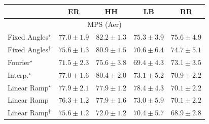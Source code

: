 \begin{tabular}{l|cccc|}
\toprule
            & ER & HH & LB & RR \\
\midrule
\multicolumn{5}{c}{\rule{0pt}{8pt}MPS (Aer)} \\
\midrule
Fixed Angles$^\star$ & {\cellcolor[HTML]{8A55A7}} \color[HTML]{F1F1F1} $77.0\pm 1.9$ & {\cellcolor[HTML]{831F86}} \color[HTML]{F1F1F1} $82.2\pm 1.3$ & {\cellcolor[HTML]{8C66AF}} \color[HTML]{F1F1F1} $75.3\pm 3.9$ & {\cellcolor[HTML]{8B62AD}} \color[HTML]{F1F1F1} $75.6\pm 4.9$ \\
Fixed Angles$^\dagger$ & {\cellcolor[HTML]{8B62AD}} \color[HTML]{F1F1F1} $75.6\pm 1.3$ & {\cellcolor[HTML]{852D90}} \color[HTML]{F1F1F1} $80.9\pm 1.5$ & {\cellcolor[HTML]{8C93C4}} \color[HTML]{F1F1F1} $70.6\pm 6.4$ & {\cellcolor[HTML]{8C6CB1}} \color[HTML]{F1F1F1} $74.7\pm 5.1$ \\
Fourier$^\star$ & {\cellcolor[HTML]{8C8BC0}} \color[HTML]{F1F1F1} $71.5\pm 2.3$ & {\cellcolor[HTML]{8B62AD}} \color[HTML]{F1F1F1} $75.6\pm 3.8$ & {\cellcolor[HTML]{909ECA}} \color[HTML]{F1F1F1} $69.4\pm 4.3$ & {\cellcolor[HTML]{8C7AB8}} \color[HTML]{F1F1F1} $73.1\pm 3.5$ \\
Interp.$^\star$ & {\cellcolor[HTML]{8A55A7}} \color[HTML]{F1F1F1} $77.0\pm 1.6$ & {\cellcolor[HTML]{863394}} \color[HTML]{F1F1F1} $80.4\pm 2.0$ & {\cellcolor[HTML]{8C7AB8}} \color[HTML]{F1F1F1} $73.1\pm 5.2$ & {\cellcolor[HTML]{8C90C3}} \color[HTML]{F1F1F1} $70.9\pm 2.2$ \\
Linear Ramp$^\star$ & {\cellcolor[HTML]{894DA3}} \color[HTML]{F1F1F1} $77.9\pm 2.1$ & {\cellcolor[HTML]{894DA3}} \color[HTML]{F1F1F1} $77.9\pm 1.2$ & {\cellcolor[HTML]{8948A0}} \color[HTML]{F1F1F1} $78.4\pm 4.3$ & {\cellcolor[HTML]{8D98C7}} \color[HTML]{F1F1F1} $70.1\pm 2.2$ \\
Linear Ramp & {\cellcolor[HTML]{8B5CAA}} \color[HTML]{F1F1F1} $76.3\pm 1.2$ & {\cellcolor[HTML]{894DA3}} \color[HTML]{F1F1F1} $77.9\pm 1.6$ & {\cellcolor[HTML]{8C7CB9}} \color[HTML]{F1F1F1} $73.0\pm 5.9$ & {\cellcolor[HTML]{8D98C7}} \color[HTML]{F1F1F1} $70.1\pm 2.2$ \\
Linear Ramp$^\dagger$ & {\cellcolor[HTML]{8B62AD}} \color[HTML]{F1F1F1} $75.6\pm 1.2$ & {\cellcolor[HTML]{8C85BE}} \color[HTML]{F1F1F1} $72.0\pm 1.2$ & {\cellcolor[HTML]{8C95C6}} \color[HTML]{F1F1F1} $70.4\pm 5.7$ & {\cellcolor[HTML]{92A3CD}} \color[HTML]{F1F1F1} $68.9\pm 2.8$ \\

\end{tabular}
